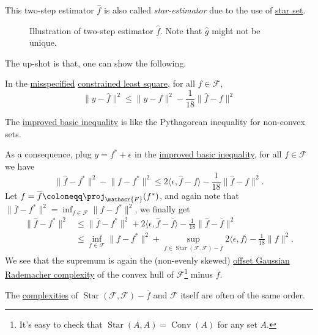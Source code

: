 This two-step estimator \(\hat{f} \) is also called \emph{star-estimator} due to the use of \hyperref[def:star-set]{star set}.

\begin{figure}[H]
	\centering
	\caption{Illustration of two-step estimator \(\hat{f} \). Note that \(\hat{g} \) might not be unique.}
	\label{fig:star-estimator}
\end{figure}

The up-shot is that, one can show the following.

\begin{lemma}\label{lma:improved-basic-inequality}
	In the \hyperref[def:misspecified]{misspecified} \hyperref[prb:constrained-LS]{constrained least square}, for all \(f\in \mathscr{F} \),
	\[
		\lVert y - \hat{f}  \rVert ^2 \leq \lVert y - f \rVert ^2 - \frac{1}{18} \lVert \hat{f} - f \rVert ^2
	\]
\end{lemma}

\begin{remark}
	The \hyperref[lma:improved-basic-inequality]{improved basic inequality} is like the Pythagorean inequality for non-convex sets.
\end{remark}

As a consequence, plug \(y = f^{\ast} + \epsilon \) in the \hyperref[lma:improved-basic-inequality]{improved basic inequality}, for all \(f\in \mathscr{F} \) we have
\[
	\lVert \hat{f} - f^{\ast}  \rVert ^2 - \lVert f - f^{\ast}  \rVert ^2
	\leq 2 \langle \epsilon , \hat{f} - f \rangle - \frac{1}{18} \lVert \hat{f} - f \rVert ^2.
\]
Let \(f = \overline{f} \coloneqq \proj_{\mathscr{F} }(f^{\ast} ) \), and again note that \(\lVert \overline{f} - f^{\ast} \rVert ^2 = \inf _{f\in \mathscr{F} } \lVert f - f^{\ast} \rVert ^2\), we finally get
\[
	\begin{split}
		\lVert \hat{f} - f^{\ast} \rVert ^2
		 & \leq \lVert \overline{f} - f^{\ast} \rVert ^2 +  2 \langle \epsilon , \hat{f} - \overline{f} \rangle - \frac{1}{18} \lVert \hat{f} - \overline{f} \rVert ^2                                                       \\
		 & \leq \inf _{f\in \mathscr{F} } \lVert f - f^{\ast} \rVert ^2 + \sup _{f\in \mathop{\mathrm{Star}}(\mathscr{F} , \mathscr{F} ) - \overline{f}  } 2 \langle \epsilon , f \rangle - \frac{1}{18} \lVert f \rVert ^2.
	\end{split}
\]
We see that the supremum is again the (non-evenly skewed) \hyperref[def:offset-Gaussian-Rademacher-complexity]{offset Gaussian Rademacher complexity} of the convex hull of \(\mathscr{F} \)\footnote{It's easy to check that \(\mathop{\mathrm{Star}}(A, A) = \mathop{\mathrm{Conv}}(A) \) for any set \(A\).} minus \(\overline{f} \).

\begin{remark}
	The \hyperref[def:offset-Gaussian-Rademacher-complexity]{complexities} of \(\mathop{\mathrm{Star}}(\mathscr{F} , \mathscr{F} ) - \overline{f} \) and \(\mathscr{F} \) itself are often of the same order.
\end{remark}